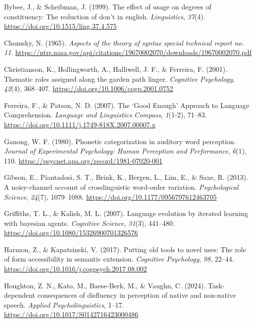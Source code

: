 \documentclass[
  12pt,
]{scrartcl}
\newlength{\cslhangindent}
\newenvironment{CSLReferences}[2] %
 {\begin{list}{}{%
  \setlength{\itemindent}{0pt}
  \setlength{\leftmargin}{0pt}
  \setlength{\parsep}{0pt}
  \ifodd #1
   \setlength{\leftmargin}{\cslhangindent}
   \setlength{\itemindent}{-1\cslhangindent}
  \fi
  \setlength{\itemsep}{#2\baselineskip}}}
 {\end{list}}
\begin{document}
\begin{CSLReferences}{1}{0}
Bybee, J., \& Scheibman, J. (1999). The effect of usage on degrees of
constituency: The reduction of don't in english. \emph{Linguistics},
\emph{37}(4). \url{https://doi.org/10.1515/ling.37.4.575}

Chomsky, N. (1965). \emph{Aspects of the theory of syntax special
technical report no. 11}.
\url{https://ntrs.nasa.gov/api/citations/19670002070/downloads/19670002070.pdf}

Christianson, K., Hollingworth, A., Halliwell, J. F., \& Ferreira, F.
(2001). Thematic roles assigned along the garden path linger.
\emph{Cognitive Psychology}, \emph{42}(4), 368--407.
\url{https://doi.org/10.1006/cogp.2001.0752}

Ferreira, F., \& Patson, N. D. (2007). The {`}Good Enough{'} Approach to
Language Comprehension. \emph{Language and Linguistics Compass},
\emph{1}(1-2), 71--83.
\url{https://doi.org/10.1111/j.1749-818X.2007.00007.x}

Ganong, W. F. (1980). Phonetic categorization in auditory word
perception. \emph{Journal of Experimental Psychology: Human Perception
and Performance}, \emph{6}(1), 110.
\url{https://psycnet.apa.org/record/1981-07020-001}

Gibson, E., Piantadosi, S. T., Brink, K., Bergen, L., Lim, E., \& Saxe,
R. (2013). A noisy-channel account of crosslinguistic word-order
variation. \emph{Psychological Science}, \emph{24}(7), 1079--1088.
\url{https://doi.org/10.1177/0956797612463705}

Griffiths, T. L., \& Kalish, M. L. (2007). Language evolution by
iterated learning with bayesian agents. \emph{Cognitive Science},
\emph{31}(3), 441--480. \url{https://doi.org/10.1080/15326900701326576}

Harmon, Z., \& Kapatsinski, V. (2017). Putting old tools to novel uses:
The role of form accessibility in semantic extension. \emph{Cognitive
Psychology}, \emph{98}, 22--44.
\url{https://doi.org/10.1016/j.cogpsych.2017.08.002}

Houghton, Z. N., Kato, M., Baese-Berk, M., \& Vaughn, C. (2024).
Task-dependent consequences of disfluency in perception of native and
non-native speech. \emph{Applied Psycholinguistics}, 1--17.
\url{https://doi.org/10.1017/S0142716423000486}


\end{CSLReferences}
\end{document}
